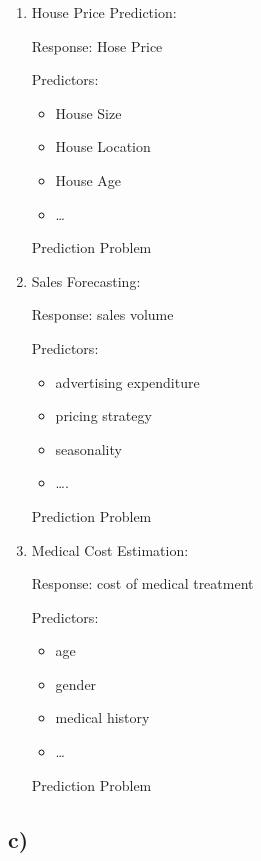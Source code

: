\documentclass[
]{article}
\begin{document}
\begin{enumerate}
\def\labelenumi{\arabic{enumi}.}
\item
  House Price Prediction:

  Response: Hose Price

  Predictors:

  \begin{itemize}
  \item
    House Size
  \item
    House Location
  \item
    House Age
  \item
    \ldots{}
  \end{itemize}

  Prediction Problem
\item
  Sales Forecasting:

  Response: sales volume

  Predictors:

  \begin{itemize}
  \item
    advertising expenditure
  \item
    pricing strategy
  \item
    seasonality
  \item
    \ldots.
  \end{itemize}

  Prediction Problem
\item
  Medical Cost Estimation:

  Response: cost of medical treatment

  Predictors:

  \begin{itemize}
  \item
    age
  \item
    gender
  \item
    medical history
  \item
    \ldots{}
  \end{itemize}

  Prediction Problem
\end{enumerate}

\hypertarget{c-2}{%
\subsection{c)}\label{c-2}}
\end{document}
